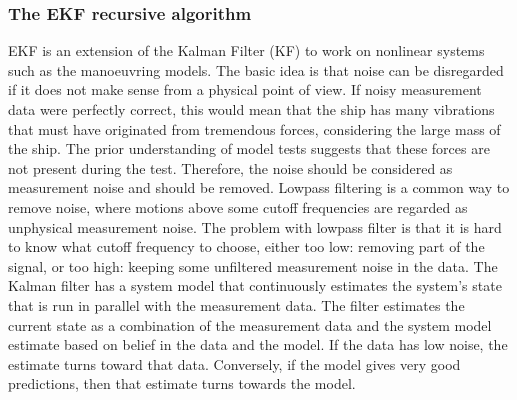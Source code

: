 \documentclass[review]{elsarticle}
\begin{document}
\subsubsection{The EKF recursive algorithm}
\label{\detokenize{04.01_EK:the-ekf-recursive-algorithm}}
\sphinxAtStartPar
EKF is an extension of the Kalman Filter (KF) to work on nonlinear systems such as the manoeuvring models. The basic idea is that noise can be disregarded if it does not make sense from a physical point of view. If noisy measurement data were perfectly correct, this would mean that the ship has many vibrations that must have originated from tremendous forces, considering the large mass of the ship. The prior understanding of model tests suggests that these forces are not present during the test. Therefore, the noise should be considered as measurement noise and should be removed. Low\sphinxhyphen{}pass filtering is a common way to remove noise, where motions above some cut\sphinxhyphen{}off frequencies are regarded as unphysical measurement noise. The problem with low\sphinxhyphen{}pass filter is that it is hard to know what cut\sphinxhyphen{}off frequency to choose, either too low: removing part of the signal, or too high: keeping some unfiltered measurement noise in the data. The Kalman filter has a system model that continuously estimates the system’s state that is run in parallel with the measurement data. The filter estimates the current state as a combination of the measurement data and the system model estimate based on belief in the data and the model. If the data has low noise, the estimate turns toward that data. Conversely, if the model gives very good predictions, then that estimate turns towards the model.
\end{document}
